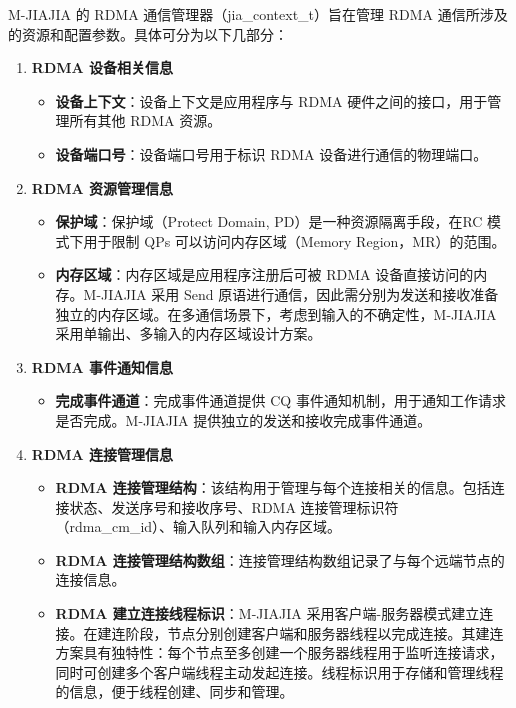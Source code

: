 {    M-JIAJIA 的 RDMA 通信管理器（jia\_context\_t）旨在管理 RDMA 通信所涉及的资源和配置参数。具体可分为以下几部分：

    \begin{enumerate}[label=\arabic*., leftmargin=1em, align=left]
        \item \textbf{RDMA 设备相关信息}
              \begin{itemize}
                  \item \textbf{设备上下文}：设备上下文是应用程序与 RDMA 硬件之间的接口，用于管理所有其他 RDMA 资源。
                  \item \textbf{设备端口号}：设备端口号用于标识 RDMA 设备进行通信的物理端口。
              \end{itemize}

        \item \textbf{RDMA 资源管理信息}
              \begin{itemize}
                  \item \textbf{保护域}：保护域（Protect Domain, PD）是一种资源隔离手段，在RC 模式下用于限制 QPs 可以访问内存区域（Memory Region，MR）的范围。
                  \item \textbf{内存区域}：内存区域是应用程序注册后可被 RDMA 设备直接访问的内存。M-JIAJIA 采用 Send 原语进行通信，因此需分别为发送和接收准备独立的内存区域。在多通信场景下，考虑到输入的不确定性，M-JIAJIA 采用单输出、多输入的内存区域设计方案。
              \end{itemize}

        \item \textbf{RDMA 事件通知信息}
              \begin{itemize}
                  \item \textbf{完成事件通道}：完成事件通道提供 CQ 事件通知机制，用于通知工作请求是否完成。M-JIAJIA 提供独立的发送和接收完成事件通道。
              \end{itemize}

        \item \textbf{RDMA 连接管理信息}
              \begin{itemize}
                  \item \textbf{RDMA 连接管理结构}：该结构用于管理与每个连接相关的信息。包括连接状态、发送序号和接收序号、RDMA 连接管理标识符（rdma\_cm\_id）、输入队列和输入内存区域。
                  \item \textbf{RDMA 连接管理结构数组}：连接管理结构数组记录了与每个远端节点的连接信息。
                  \item \textbf{RDMA 建立连接线程标识}：M-JIAJIA 采用客户端-服务器模式建立连接。在建连阶段，节点分别创建客户端和服务器线程以完成连接。其建连方案具有独特性：每个节点至多创建一个服务器线程用于监听连接请求，同时可创建多个客户端线程主动发起连接。线程标识用于存储和管理线程的信息，便于线程创建、同步和管理。
              \end{itemize}
    \end{enumerate}

}

